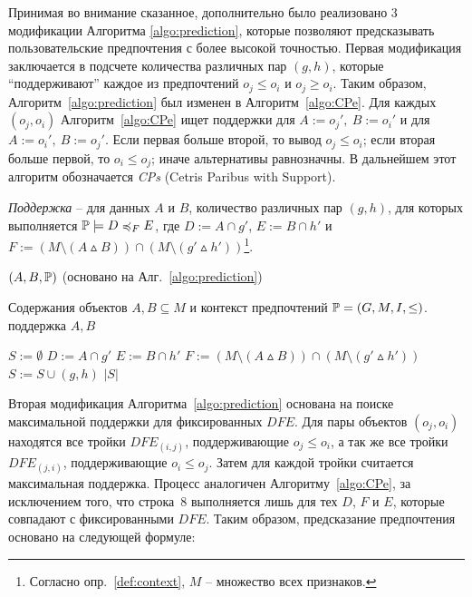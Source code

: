 	Принимая во внимание сказанное, дополнительно было реализовано 3 модификации Алгоритма \ref{algo:prediction}, которые позволяют предсказывать пользовательские предпочтения с более высокой точностью.
	Первая модификация заключается в подсчете количества различных пар $(g,h)$, которые ``поддерживают'' каждое из предпочтений $o_j \leq o_i$ и $o_j \geq o_i$. Таким образом, Алгоритм~\ref{algo:prediction} был изменен в Алгоритм~\ref{algo:CPe}. Для каждых $(o_j, o_i)$ Алгоритм~\ref{algo:CPe} ищет поддержки для $A:=o_j',\: B:=o_i'$ и для $A:=o_i',\: B:=o_j'$. Если первая больше второй, то вывод $o_j \leq o_i$; если вторая больше первой, то $o_i \leq o_j$; иначе альтернативы равнозначны. В дальнейшем этот алгоритм обозначается \emph{CPs} (Cetris Paribus with Support).
	
	\begin{definition}
		\emph{Поддержка} – для данных $A$ и $B$, количество различных пар $(g, h)$, для которых выполняется $\PP \models \DEF$, где $D := A \cap g'$, $E := B \cap h'$ и $F := (M \setminus (A \vartriangle B)) \cap (M \setminus (g' \vartriangle h'))$\footnote{Согласно опр.~\ref{def:context}, $M$ – множество всех признаков.}.
	\end{definition}
	
	\begin{algorithm}
		\caption{$(A, B, \mathbb{P})$ (основано на Алг.~\ref{algo:prediction})}
		\label{algo:CPe}
		\begin{algorithmic}[1]
			\REQUIRE Содержания объектов $A, B \subseteq M$ и контекст предпочтений $\mathbb{P} = (G, M, I, \leq)$.
			\ENSURE поддержка $A, B$
			\item[]
			\STATE $S := \emptyset$
			\STATE $D := A \cap g'$
			\STATE $E := B \cap h'$
			\STATE $F := (M \setminus (A \vartriangle B)) \cap (M \setminus (g' \vartriangle h'))$
			\IF{$\PP \models \DEF$}
			\STATE $S := S \cup (g, h)$
			\ENDIF
			\ENDFOR
			\ENDFOR
			\RETURN $|S|$
		\end{algorithmic}
	\end{algorithm}
	
	Вторая модификация Алгоритма~\ref{algo:prediction} основана на поиске максимальной поддержки для фиксированных $DFE$. Для пары объектов $(o_j, o_i)$ находятся все тройки $DFE_{(i,j)}$, поддерживающие $o_j \leq o_i$, а так же все тройки $DFE_{(j,i)}$, поддерживающие $o_i \leq o_j$. Затем для каждой тройки считается максимальная поддержка. Процесс аналогичен Алгоритму~\ref{algo:CPe}, за исключением того, что строка~8 выполняется лишь для тех $D$, $F$ и $E$, которые совпадают с фиксированными $DFE$. Таким образом, предсказание предпочтения основано на следующей формуле:
	
